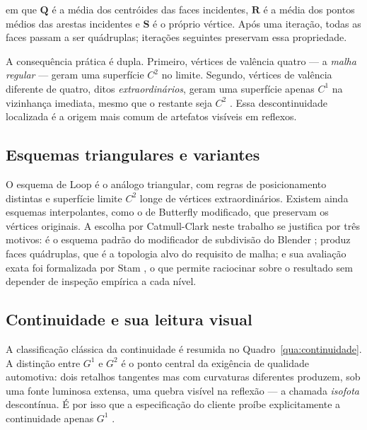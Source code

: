 \noindent em que $\mathbf{Q}$ \'e a m\'edia dos centr\'oides das faces incidentes, $\mathbf{R}$
\'e a m\'edia dos pontos m\'edios das arestas incidentes e $\mathbf{S}$ \'e o pr\'oprio
v\'ertice. Ap\'os uma itera\c{c}\~ao, todas as faces passam a ser qu\'adruplas; itera\c{c}\~oes
seguintes preservam essa propriedade.

A consequ\^encia pr\'atica \'e dupla. Primeiro, v\'ertices de val\^encia quatro --- a
\emph{malha regular} --- geram uma superf\'icie $C^2$ no limite. Segundo, v\'ertices de
val\^encia diferente de quatro, ditos \emph{extraordin\'arios}, geram uma superf\'icie apenas
$C^1$ na vizinhan\c{c}a imediata, mesmo que o restante seja $C^2$ \cite{stam1998}. Essa
descontinuidade localizada \'e a origem mais comum de artefatos vis\'iveis em reflexos.

\subsection{Esquemas triangulares e variantes}

O esquema de Loop \cite{loop1987} \'e o an\'alogo triangular, com regras de posicionamento
distintas e superf\'icie limite $C^2$ longe de v\'ertices extraordin\'arios. Existem ainda
esquemas interpolantes, como o de Butterfly modificado, que preservam os v\'ertices originais.
A escolha por Catmull-Clark neste trabalho se justifica por tr\^es motivos: \'e o esquema padr\~ao
do modificador de subdivis\~ao do Blender \cite{blender5manual}; produz faces qu\'adruplas, que
\'e a topologia alvo do requisito de malha; e sua avalia\c{c}\~ao exata foi formalizada por Stam
\cite{stam1998}, o que permite raciocinar sobre o resultado sem depender de inspe\c{c}\~ao
emp\'irica a cada n\'ivel.

\subsection{Continuidade e sua leitura visual}

A classifica\c{c}\~ao cl\'assica da continuidade \'e resumida no Quadro~\ref{qua:continuidade}.
A distin\c{c}\~ao entre $G^1$ e $G^2$ \'e o ponto central da exig\^encia de qualidade
automotiva: dois retalhos tangentes mas com curvaturas diferentes produzem, sob uma fonte
luminosa extensa, uma quebra vis\'ivel na reflex\~ao --- a chamada \emph{isofota} descont\'inua.
\'E por isso que a especifica\c{c}\~ao do cliente pro\'ibe explicitamente a continuidade apenas
$G^1$ \cite{halstead1993}.

